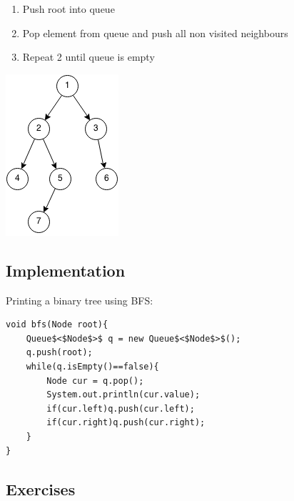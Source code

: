 \documentclass[11pt,oneside]{book}
\makeatletter
\def\maxwidth#1{\ifdim\Gin@nat@width>#1 #1\else\Gin@nat@width\fi}
\makeatother
\begin{document}
\begin{enumerate}
\item Push root into queue
\item Pop element from queue and push all non visited neighbours
\item Repeat 2 until queue is empty
\end{enumerate}

\includegraphics[width=\maxwidth{\textwidth}]{bfs.png}

\subsection{Implementation}

Printing a binary tree using BFS:

\begin{lstlisting}
void bfs(Node root){
    Queue$<$Node$>$ q = new Queue$<$Node$>$();
    q.push(root);
    while(q.isEmpty()==false){
        Node cur = q.pop();
        System.out.println(cur.value);
        if(cur.left)q.push(cur.left);
        if(cur.right)q.push(cur.right);
    }
}
\end{lstlisting}

\subsection{Exercises}
\end{document}
